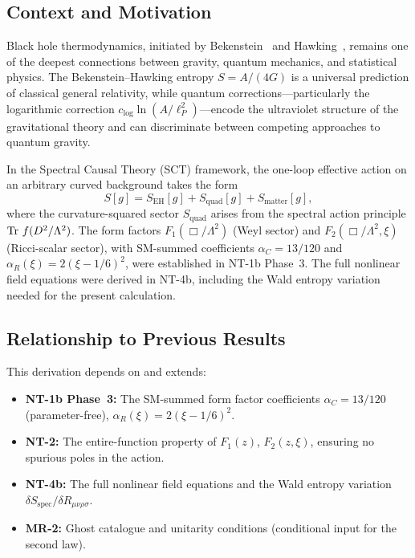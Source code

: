 \documentclass[11pt,a4paper]{article}
\theoremstyle{plain}
\theoremstyle{definition}
\begin{document}
\subsection{Context and Motivation}

Black hole thermodynamics, initiated by Bekenstein~\cite{Bek73} and
Hawking~\cite{Haw75}, remains one of the deepest connections between
gravity, quantum mechanics, and statistical physics.  The
Bekenstein--Hawking entropy $S = A/(4G)$ is a universal prediction of
classical general relativity, while quantum corrections---particularly
the logarithmic correction $c_{\log}\ln(A/\ell_P^2)$---encode the
ultraviolet structure of the gravitational theory and can discriminate
between competing approaches to quantum gravity.

In the Spectral Causal Theory (SCT) framework, the one-loop effective
action on an arbitrary curved background takes the form
\begin{equation}\label{eq:S-total}
  S[g] = S_{\mathrm{EH}}[g] + S_{\mathrm{quad}}[g]
  + S_{\mathrm{matter}}[g],
\end{equation}
where the curvature-squared sector $S_{\mathrm{quad}}$ arises from the
spectral action principle $\Tr\,f(D^2/\Lambda^2)$.  The form factors
$F_1(\Box/\Lambda^2)$ (Weyl sector) and $F_2(\Box/\Lambda^2,\xi)$
(Ricci-scalar sector), with SM-summed coefficients
$\alpha_C = 13/120$ and
$\alpha_R(\xi) = 2(\xi - 1/6)^2$, were established in NT-1b Phase~3.
The full nonlinear field equations were derived in NT-4b, including the
Wald entropy variation needed for the present calculation.

\subsection{Relationship to Previous Results}

This derivation depends on and extends:
\begin{itemize}[nosep]
  \item \textbf{NT-1b Phase~3:} The SM-summed form factor coefficients
    $\alpha_C = 13/120$ (parameter-free), $\alpha_R(\xi) = 2(\xi-1/6)^2$.
  \item \textbf{NT-2:} The entire-function property of $F_1(z)$,
    $F_2(z,\xi)$, ensuring no spurious poles in the action.
  \item \textbf{NT-4b:} The full nonlinear field equations and the Wald
    entropy variation $\delta S_{\mathrm{spec}}/\delta R_{\mu\nu\rho\sigma}$.
  \item \textbf{MR-2:} Ghost catalogue and unitarity conditions
    (conditional input for the second law).
\end{itemize}
\end{document}
